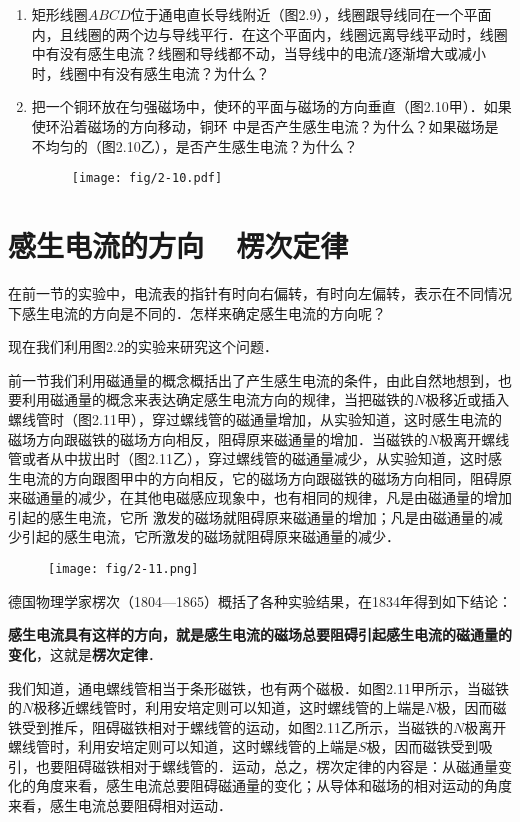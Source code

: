 \begin{enumerate}
    \item 矩形线圈$ABCD$位于通电直长导线附近（图2.9），线圈跟导线同在一个平面内，且线圈的两个边与导线平行．在这个平面内，线圈远离导线平动时，线圈中有没有感生电流？线圈和导线都不动，当导线中的电流$I$逐渐增大或减小时，线圈中有没有感生电流？为什么？
    \item 把一个铜环放在匀强磁场中，使环的平面与磁场的方向垂直（图2.10甲）．如果使环沿着磁场的方向移动，铜环
中是否产生感生电流？为什么？如果磁场是不均匀的（图2.10乙），是否产生感生电流？为什么？
\begin{figure}[htp]\centering
\texttt{[image: fig/2-10.pdf]}
\caption{}
\end{figure}
\end{enumerate}


\section{感生电流的方向~~楞次定律}
在前一节的实验中，电流表的指针有时向右偏转，有时向左偏转，表示在不同情况下感生电流的方向是不同的．怎样来确定感生电流的方向呢？

现在我们利用图2.2的实验来研究这个问题．

前一节我们利用磁通量的概念概括出了产生感生电流的条件，由此自然地想到，也要利用磁通量的概念来表达确定感生电流方向的规律，当把磁铁的$N$极移近或插入螺线管时（图2.11甲），穿过螺线管的磁通量增加，从实验知道，这时感生电流的磁场方向跟磁铁的磁场方向相反，阻碍原来磁通量的增加．当磁铁的$N$极离开螺线管或者从中拔出时（图2.11乙），穿过螺线管的磁通量减少，从实验知道，这时感生电流的方向跟图甲中的方向相反，它的磁场方向跟磁铁的磁场方向相同，阻碍原来磁通量的减少，在其他电磁感应现象中，也有相同的规律，凡是由磁通量的增加引起的感生电流，它所
激发的磁场就阻碍原来磁通量的增加；凡是由磁通量的减少引起的感生电流，它所激发的磁场就阻碍原来磁通量的减少．
\begin{figure}[htp]\centering
\texttt{[image: fig/2-11.png]}
\caption{}
\end{figure}

德国物理学家楞次（1804—1865）概括了各种实验结果，在1834年得到如下结论：

\textbf{感生电流具有这样的方向，就是感生电流的磁场总要阻碍引起感生电流的磁通量的变化}，这就是\textbf{楞次定律}．

我们知道，通电螺线管相当于条形磁铁，也有两个磁极．如图2.11甲所示，当磁铁的$N$极移近螺线管时，利用安培定则可以知道，这时螺线管的上端是$N$极，因而磁铁受到推斥，阻碍磁铁相对于螺线管的运动，如图2.11乙所示，当磁铁的$N$极离开螺线管时，利用安培定则可以知道，这时螺线管的上端是$S$极，因而磁铁受到吸引，也要阻碍磁铁相对于螺线管的．运动，总之，楞次定律的内容是：从磁通量变化的角度来看，感生电流总要阻碍磁通量的变化；从导体和磁场的相对运动的角度来看，感生电流总要阻碍相对运动．

